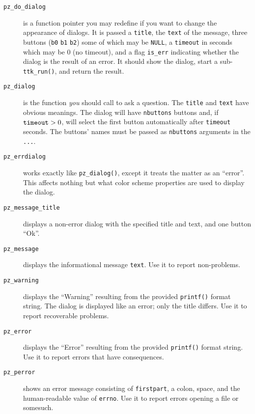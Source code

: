 \documentclass[12pt,letterpaper]{report}
\let\ttt\tt
\def\tt{\def\_{{\ttt\char`\_}}\ttt}
\begin{document}
\begin{description}
\item[{\tt pz_do_dialog}] is a function pointer you may redefine if you want to
change the appearance of dialogs. It is passed a \verb|title|, the \verb|text|
of the message, three buttons (\verb|b0| \verb|b1| \verb|b2|) some of which
may be \verb|NULL|, a \verb|timeout| in seconds which may be 0 (no timeout), and
a flag \verb|is_err| indicating whether the dialog is the result of an error.
It should show the dialog, start a sub-\verb|ttk_run()|, and return the result.
\item[{\tt pz_dialog}] is the function {\it you} should call to ask a question.
The \verb|title| and \verb|text| have obvious meanings. The dialog will have
\verb|nbuttons| buttons and, if $\verb|timeout| > 0$, will select the first
button automatically after \verb|timeout| seconds. The buttons' names
must be passed as \verb|nbuttons| arguments in the \verb|...|.
\item[{\tt pz_errdialog}] works exactly like \verb|pz_dialog()|, except it treats
the matter as an ``error''. This affects nothing but what color scheme properties
are used to display the dialog.
\item[{\tt pz_message_title}] displays a non-error dialog with the specified title and text, and
one button ``Ok''.
\item[{\tt pz_message}] displays the informational message \verb|text|. Use it to report
non-problems.
\item[{\tt pz_warning}] displays the ``Warning'' resulting from the provided \verb|printf()|
format string. The dialog is displayed like an error; only the title differs. Use it to
report recoverable problems.
\item[{\tt pz_error}] displays the ``Error'' resulting from the provided \verb|printf()| format
string. Use it to report errors that have consequences.
\item[{\tt pz_perror}] shows an error message consisting of \verb|firstpart|, a colon, space,
and the human-readable value of \verb|errno|. Use it to report errors opening a file or somesuch.
\end{description}
\end{document}
